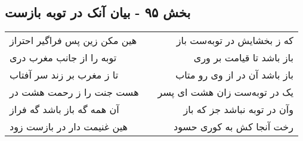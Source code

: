 \begin{center}
\section*{بخش ۹۵ - بیان آنک در توبه بازست}
\label{sec:sh095}
\begin{longtable}{l p{0.5cm} r}
هین مکن زین پس فراگیر احتراز
&&
که ز بخشایش در توبه‌ست باز
\\
توبه را از جانب مغرب دری
&&
باز باشد تا قیامت بر وری
\\
تا ز مغرب بر زند سر آفتاب
&&
باز باشد آن در از وی رو متاب
\\
هست جنت را ز رحمت هشت در
&&
یک در توبه‌ست زان هشت ای پسر
\\
آن همه گه باز باشد گه فراز
&&
وآن در توبه نباشد جز که باز
\\
هین غنیمت دار در بازست زود
&&
رخت آنجا کش به کوری حسود
\\
\end{longtable}
\end{center}
